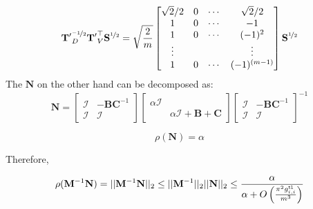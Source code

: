\documentclass[journal,onecolumn]{IEEEtran}
\newcommand{\vtt}[1]{%
  \text{\normalfont\ttfamily\detokenize{#1}}%
}
\begin{document}
$$\mathbf{T'}^{\nicefrac{-1}{2}}_D \mathbf{T'}^\top_V \mathbf{S}^{\nicefrac{1}{2}} = \sqrt{\frac{2}{m}} \begin{bmatrix}
   \sqrt{2}/2 & 0 & \cdots & \sqrt{2}/2 \\
   1 & 0 & \cdots & -1 \\
   1 & 0 & \cdots & (-1)^2 \\
   \vdots & & & \vdots \\
   1 & 0 & \cdots & (-1)^{(m-1)}
\end{bmatrix} \mathbf{S}^{\nicefrac{1}{2}}$$
\fi
The $\mathbf{N}$ on the other hand can be decomposed as:
$$\mathbf{N} = \begin{bmatrix} \mathcal{I} & -\mathbf{B}\mathbf{C}^{-1} \\ \mathcal{I} & \mathcal{I} \end{bmatrix} \begin{bmatrix} \alpha\mathcal{I} \\ & \alpha\mathcal{I} + \mathbf{B} + \mathbf{C} \end{bmatrix} \begin{bmatrix} \mathcal{I} & -\mathbf{B}\mathbf{C}^{-1} \\ \mathcal{I} & \mathcal{I} \end{bmatrix}^{-1}$$

$$\rho(\mathbf{N}) = \alpha$$

Therefore,

$$\rho(\mathbf{M}^{-1}\mathbf{N}) = ||\mathbf{M}^{-1}\mathbf{N}||_2 \le ||\mathbf{M}^{-1}||_2||\mathbf{N}||_2 \le \frac{\alpha}{\alpha + O\left( \frac{\pi^2g^\vtt{tl}_{i,i}}{m^3} \right)} $$

\end{document}
